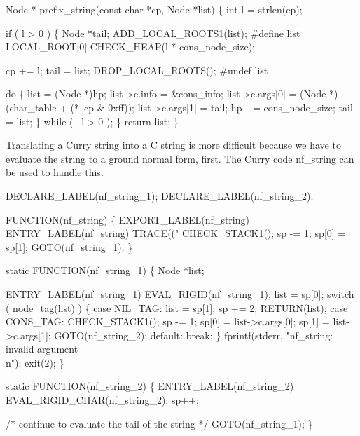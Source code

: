 Node *
prefix_string(const char *cp, Node *list)
\{
    int l = strlen(cp);

    if ( l > 0 )
    \{
        Node *tail;
        ADD_LOCAL_ROOTS1(list);
#define list LOCAL_ROOT[0]
        CHECK_HEAP(l * cons_node_size);

        cp  += l;
        tail = list;
        DROP_LOCAL_ROOTS();
#undef list

        do
        \{
            list            = (Node *)hp;
            list->c.info    = &cons_info;
            list->c.args[0] = (Node *)(char_table + (*--cp & 0xff));
            list->c.args[1] = tail;
            hp             += cons_node_size;
            tail            = list;
        \}
        while ( --l > 0 );
    \}
    return list;
\}

\nwendcode{}\nwdocspar
Translating a Curry string into a C string is more difficult because
we have to evaluate the string to a ground normal form, first. The
Curry code {\Tt{}nf{\_}string\nwendquote} can be used to handle this.

\nwenddocs{}\plusendmoddef\nwstartdeflinemarkup{}\nwenddeflinemarkup
DECLARE_LABEL(nf_string_1);
DECLARE_LABEL(nf_string_2);

FUNCTION(nf_string)
\{
    EXPORT_LABEL(nf_string)
 ENTRY_LABEL(nf_string)
    TRACE(("%
    CHECK_STACK1();
    sp   -= 1;
    sp[0] = sp[1];
    GOTO(nf_string_1);
\}

static
FUNCTION(nf_string_1)
\{
    Node *list;

 ENTRY_LABEL(nf_string_1)
    EVAL_RIGID(nf_string_1);
    list = sp[0];
    switch ( node_tag(list) )
    \{
    case NIL_TAG:
        list = sp[1];
        sp  += 2;
        RETURN(list);
    case CONS_TAG:
        CHECK_STACK1();
        sp   -= 1;
        sp[0] = list->c.args[0];
        sp[1] = list->c.args[1];
        GOTO(nf_string_2);
    default:
        break;
    \}
    fprintf(stderr, "nf_string: invalid argument\\n");
    exit(2);
\}

static
FUNCTION(nf_string_2)
\{
 ENTRY_LABEL(nf_string_2)
    EVAL_RIGID_CHAR(nf_string_2);
    sp++;

    /* continue to evaluate the tail of the string */
    GOTO(nf_string_1);
\}

